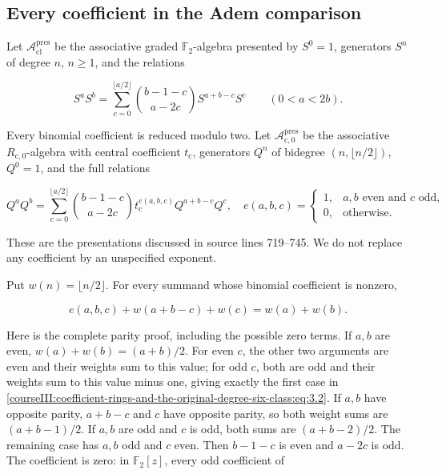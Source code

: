 \label{courseIII:coefficient-rings-and-the-original-degree-six-class:coefficient-adem-maps}

\subsection{Every coefficient in the Adem comparison}
\label{courseIII:coefficient-rings-and-the-original-degree-six-class:section-3}

\label{courseIII:coefficient-rings:3}

Let \(\mathcal A_{\mathrm{cl}}^{\mathrm{pres}}\) be the associative graded \(\mathbb F_2\)-algebra presented by \(S^0=1\), generators \(S^n\) of degree \(n\), \(n\geq1\), and the relations

\begin{equation}
S^aS^b=
 \sum_{c=0}^{\lfloor a/2\rfloor}
 \binom{b-1-c}{a-2c}S^{a+b-c}S^c
 \qquad(0<a<2b).
 \label{courseIII:coefficient-rings-and-the-original-degree-six-class:eq:3.1}
\end{equation}

Every binomial coefficient is reduced modulo two. Let \(\mathcal A_{\mathrm c,0}^{\mathrm{pres}}\) be the associative \(R_{\mathrm c,0}\)-algebra with central coefficient \(t_{\mathrm c}\), generators \(Q^n\) of bidegree \((n,\lfloor n/2\rfloor)\), \(Q^0=1\), and the full relations

\begin{equation}
Q^aQ^b=
 \sum_{c=0}^{\lfloor a/2\rfloor}
 \binom{b-1-c}{a-2c}
 t_{\mathrm c}^{e(a,b,c)}Q^{a+b-c}Q^c,
 \quad
 e(a,b,c)=
 \begin{cases}
 1,&a,b\text{ even and }c\text{ odd},\\
 0,&\text{otherwise}.
 \end{cases}
 \label{courseIII:coefficient-rings-and-the-original-degree-six-class:eq:3.2}
\end{equation}

These are the presentations discussed in source lines 719--745. We do not replace any coefficient by an unspecified exponent.

Put \(w(n)=\lfloor n/2\rfloor\). For every summand whose binomial coefficient is nonzero,

\begin{equation}
e(a,b,c)+w(a+b-c)+w(c)=w(a)+w(b).
 \label{courseIII:coefficient-rings-and-the-original-degree-six-class:eq:3.3}
\end{equation}

Here is the complete parity proof, including the possible zero terms. If \(a,b\) are even, \(w(a)+w(b)=(a+b)/2\). For even \(c\), the other two arguments are even and their weights sum to this value; for odd \(c\), both are odd and their weights sum to this value minus one, giving exactly the first case in \eqref{courseIII:coefficient-rings-and-the-original-degree-six-class:eq:3.2}. If \(a,b\) have opposite parity, \(a+b-c\) and \(c\) have opposite parity, so both weight sums are \((a+b-1)/2\). If \(a,b\) are odd and \(c\) is odd, both sums are \((a+b-2)/2\). The remaining case has \(a,b\) odd and \(c\) even. Then \(b-1-c\) is even and \(a-2c\) is odd. The coefficient is zero: in \(\mathbb F_2[z]\), every odd coefficient of

